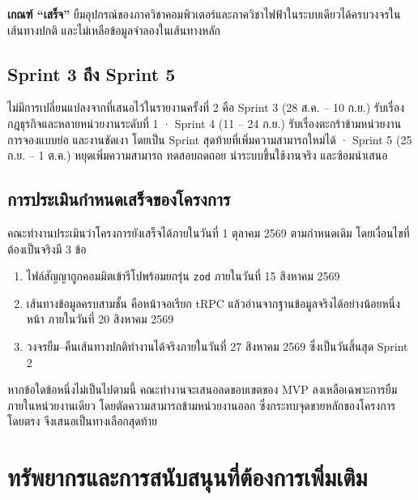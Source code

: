 \noindent\textbf{เกณฑ์ ``เสร็จ''} ยืมอุปกรณ์ของภาควิชาคอมพิวเตอร์และภาควิชาไฟฟ้าในระบบเดียวได้ครบวงจรในเส้นทางปกติ และไม่เหลือข้อมูลจำลองในเส้นทางหลัก

\subsection{Sprint 3 ถึง Sprint 5}

ไม่มีการเปลี่ยนแปลงจากที่เสนอไว้ในรายงานครั้งที่ 2 คือ Sprint 3 (28 ส.ค. – 10 ก.ย.) รับเรื่องกฎธุรกิจและหลายหน่วยงานระดับที่ 1 · Sprint 4 (11 – 24 ก.ย.) รับเรื่องตะกร้าข้ามหน่วยงาน การจองแบบย่อ และงานขัดเงา โดยเป็น Sprint สุดท้ายที่เพิ่มความสามารถใหม่ได้ · Sprint 5 (25 ก.ย. – 1 ต.ค.) หยุดเพิ่มความสามารถ ทดสอบถดถอย นำระบบขึ้นใช้งานจริง และซ้อมนำเสนอ

\subsection{การประเมินกำหนดเสร็จของโครงการ}

คณะทำงานประเมินว่าโครงการยังเสร็จได้ภายในวันที่ 1 ตุลาคม 2569 ตามกำหนดเดิม โดยเงื่อนไขที่ต้องเป็นจริงมี 3 ข้อ

\begin{enumerate}
  \item ไฟล์สัญญาถูกคอมมิตเข้ารีโปพร้อมยกรุ่น \texttt{zod} ภายในวันที่ 15 สิงหาคม 2569
  \item เส้นทางข้อมูลครบสามชั้น คือหน้าจอเรียก tRPC แล้วอ่านจากฐานข้อมูลจริงได้อย่างน้อยหนึ่งหน้า ภายในวันที่ 20 สิงหาคม 2569
  \item วงจรยืม–คืนเส้นทางปกติทำงานได้จริงภายในวันที่ 27 สิงหาคม 2569 ซึ่งเป็นวันสิ้นสุด Sprint 2
\end{enumerate}

\noindent หากข้อใดข้อหนึ่งไม่เป็นไปตามนี้ คณะทำงานจะเสนอลดขอบเขตของ MVP ลงเหลือเฉพาะการยืมภายในหน่วยงานเดียว โดยตัดความสามารถข้ามหน่วยงานออก ซึ่งกระทบจุดขายหลักของโครงการโดยตรง จึงเสนอเป็นทางเลือกสุดท้าย

\section{ทรัพยากรและการสนับสนุนที่ต้องการเพิ่มเติม}

